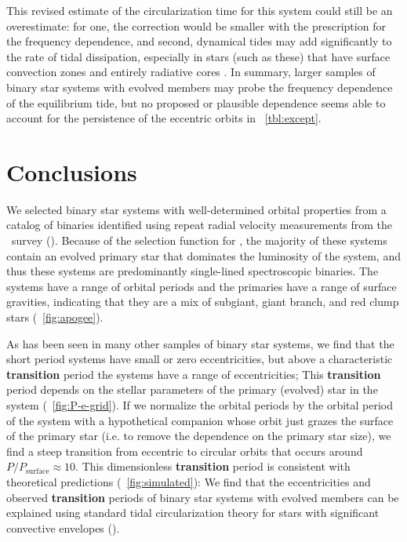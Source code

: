 \documentclass[modern, letterpaper]{aastex62}
\newcommand{\apogee}{\project{\acronym{APOGEE}}}
\newcommand{\Psurf}{\ensuremath{P_\textrm{surface}}}
\renewcommand{\changes}[1]{\textbf{#1}}
\begin{document}
This revised estimate of the circularization time for this system could still be an overestimate: for one, the correction would be smaller with the \citet{Zahn:1989} prescription for the frequency dependence, and second, dynamical tides may add significantly to the rate of tidal dissipation, especially in stars (such as these) that have surface convection zones and entirely radiative cores \citep{Goodman+Dickson98, Terquem+98, Ogilvie+Lin07, Barker+Ogilvie11, Weinberg+17}.
In summary, larger samples of binary star systems with evolved members may probe the frequency dependence of the equilibrium tide, but no proposed or plausible dependence seems able to account for the persistence of the eccentric orbits in \tablename~\ref{tbl:except}.


\section{Conclusions}
\label{sec:conclusions}

We selected binary star systems with well-determined orbital properties from a
catalog of binaries identified using repeat radial velocity measurements from
the \apogee\ survey (\citealt{Price-Whelan:2018}).
Because of the selection function for \apogee, the majority of these systems
contain an evolved primary star that dominates the luminosity of the system, and
thus these systems are predominantly single-lined spectroscopic binaries.
The systems have a range of orbital periods and the primaries have a range of
surface gravities, indicating that they are a mix of subgiant, giant branch, and
red clump stars (\figurename~\ref{fig:apogee}).

As has been seen in many other samples of binary star systems, we find that the
short period systems have small or zero eccentricities, but above a
characteristic \changes{transition} period the systems have a range of
eccentricities; This \changes{transition} period depends on the stellar
parameters of the primary (evolved) star in the system
(\figurename~\ref{fig:P-e-grid}).
If we normalize the orbital periods by the orbital period of the system with a
hypothetical companion whose orbit just grazes the surface of the primary star
(i.e. to remove the dependence on the primary star size), we find a steep
transition from eccentric to circular orbits that occurs around $P / \Psurf
\approx 10$.
This dimensionless \changes{transition} period is consistent with theoretical
predictions (\figurename~\ref{fig:simulated}):
We find that the eccentricities and observed \changes{transition} periods of
binary star systems with evolved members can be explained using standard tidal
circularization theory for stars with significant convective envelopes
(\citealt{Zahn:1977, Zahn:1989, Verbunt:1995}).
\end{document}
